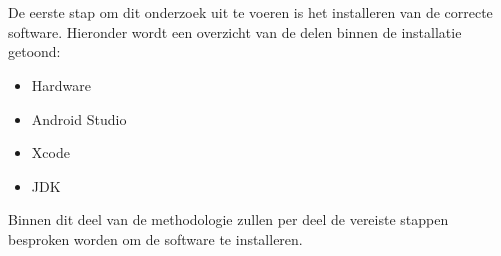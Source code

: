 
\chapter{}
\label{ch:methodologie}



\section{}
\label{sec:M-installatie}

De eerste stap om dit onderzoek uit te voeren is het installeren van de correcte software. Hieronder wordt een overzicht van de delen binnen de installatie getoond:
\begin{itemize}
    \item Hardware
    \item Android Studio
    \item Xcode
    \item JDK
\end{itemize}
Binnen dit deel van de methodologie zullen per deel de vereiste stappen besproken worden om de software te installeren.

